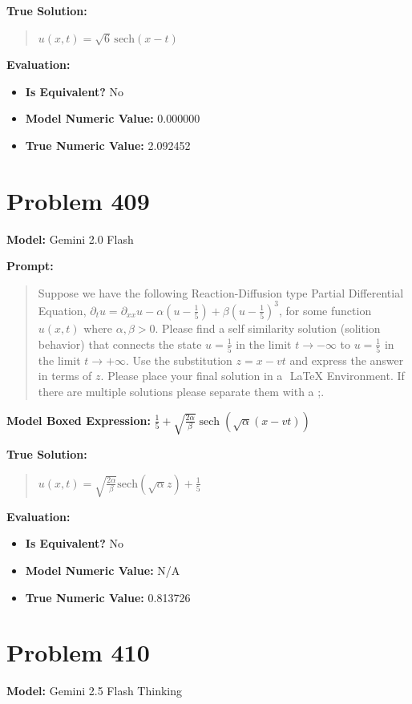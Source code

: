 \documentclass{article}
\begin{document}
\textbf{True Solution:}
\begin{quote}
$u(x,t)= \sqrt{6} \, \mathrm{sech}(x-t)$
\end{quote}

\textbf{Evaluation:}
\begin{itemize}
\item \textbf{Is Equivalent?} No
\item \textbf{Model Numeric Value:} 0.000000
\item \textbf{True Numeric Value:} 2.092452
\end{itemize}
\vspace{1cm}
\section*{Problem 409}
\textbf{Model:} Gemini 2.0 Flash

\textbf{Prompt:}
\begin{quote}
Suppose we have the following Reaction-Diffusion type Partial Differential Equation, $ \partial_t u = \partial_{xx} u - \alpha (u - \frac{1}{5}) + \beta (u - \frac{1}{5})^3 $, for some function $u(x,t)$ where $\alpha,\beta > 0$. Please find a self similarity solution (solition behavior) that connects the state $u = \frac{1}{5}$ in the limit $t \rightarrow -\infty $ to $u = \frac{1}{5}$ in the limit $t \rightarrow +\infty$. Use the substitution $z=x-vt$ and express the answer in terms of $z$. Please place your final solution in a $\boxed{}$ LaTeX Environment. If there are multiple solutions please separate them with a ;.
\end{quote}
\textbf{Model Boxed Expression:} $\frac{1}{5} + \sqrt{\frac{2\alpha}{\beta}} \operatorname{sech}(\sqrt{\alpha}(x-vt))$

\textbf{True Solution:}
\begin{quote}
$u(x,t) = \sqrt{\frac{2 \alpha}{\beta}}\text{sech}(\sqrt{\alpha} z) + \frac{1}{5}$
\end{quote}

\textbf{Evaluation:}
\begin{itemize}
\item \textbf{Is Equivalent?} No
\item \textbf{Model Numeric Value:} N/A
\item \textbf{True Numeric Value:} 0.813726
\end{itemize}
\vspace{1cm}
\section*{Problem 410}
\textbf{Model:} Gemini 2.5 Flash Thinking
\end{document}
